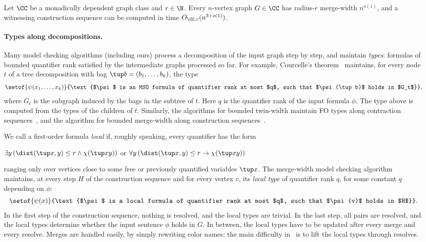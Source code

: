 \begin{theorem}\label{thm:ov-abmw}
  Let $\CC$ be a monadically dependent graph class and $r\in\N$.
  Every $n$-vertex graph $G\in\CC$ has radius-$r$ merge-width $n^{o(1)}$, and a witnessing construction sequence can be computed in time $O_{\CC,r}(n^{3+o(1)})$.
\end{theorem}

\paragraph{Types along decompositions.}
Many model checking algorithms (including ours) process a decomposition of the input graph step by step, and maintain \emph{types}: formulas of bounded quantifier rank satisfied by the intermediate graphs processed so far.
For example, Courcelle's theorem~\cite{courcelle1990monadic} maintains, for every node $t$ of a tree decomposition with bag $\tup b=(b_1,\ldots,b_k)$, the type
\[
\setof{\psi(x_1,\ldots,x_k)}{\text{$\psi$ is an MSO formula of quantifier rank at most $q$, such that $\psi(\tup b)$ holds in $G_t$}},
\]
where $G_t$ is the subgraph induced by the bags in the subtree of $t$. Here $q$ is the quantifier rank of the input formula $\phi$.
The type above is computed from the types of the children of $t$.
Similarly, the algorithms for bounded twin-width maintain FO types along contraction sequences~\cite{tww1,tww-types-icalp}, and the algorithm for bounded merge-width along construction sequences~\cite{mw-arxiv}.

We call a first-order formula \emph{local} if, roughly speaking, every quantifier has the form
\begin{center}
  $\exists y\,(\dist(\tup x,y)\le r\land\chi(\tup x y))$ \quad or \quad $\forall y\,(\dist(\tup x,y)\le r\to\chi(\tup x y))$
\end{center}
ranging only over vertices close to some free or previously quantified variables $\tup x$.
The merge-width model checking algorithm~\cite{mw-arxiv} maintains, at every step $H$ of the construction sequence and for every vertex $v$, its \emph{local type} of quantifier rank $q$, for some constant $q$ depending on $\phi$:
\[
\setof{\psi(x)}{\text{$\psi$ is a local formula of quantifier rank at most $q$, such that $\psi(v)$ holds in $H$}}.
\]
In the first step of the construction sequence, nothing is resolved, and the local types are trivial.
In the last step, all pairs are resolved, and the local types determine whether the input sentence $\phi$ holds in $G$.
In between, the local types have to be updated after every merge and every resolve.
Merges are handled easily, by simply rewriting color names; the main difficulty in~\cite{mw-arxiv} is to lift the local types through resolves.

